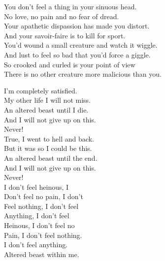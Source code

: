 



You don't feel a thing in your sinuous head. \\
No love, no pain and no fear of dread. \\

Your apathetic dispassion has made you distort. \\
And your savoir-faire is to kill for sport. \\

You'd wound a small creature and watch it wiggle. \\
And lust to feel so bad that you'd force a giggle. \\

So crooked and curled is your point of view \\
There is no other creature more malicious than you. \\


I'm completely satisfied. \\
My other life I will not miss. \\
An altered beast until I die. \\
And I will not give up on this. \\
Never! \\

True, I went to hell and back. \\
But it was so I could be this. \\
An altered beast until the end. \\
And I will not give up on this. \\
Never! \\

I don't feel heinous, I \\
Don't feel no pain, I don't \\
Feel nothing, I don't feel \\
Anything, I don't feel \\
Heinous, I don't feel no \\
Pain, I don't feel nothing. \\
I don't feel anything. \\
Altered beast within me. \\

